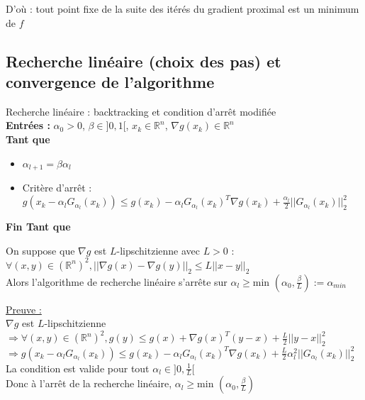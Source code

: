 \documentclass[12pt,a4paper]{article}
\newcommand{\propriete}[2]{%
    \begin{tcolorbox}[colback=white,colframe=green!25!white,title=\textbf{Propriété #1}, coltitle=black]
        #2
    \end{tcolorbox}
}
\begin{document}
\begin{enumerate}[label=\roman*)]
    D'où : tout point fixe de la suite des itérés du gradient proximal est un minimum de $f$\\    
\end{enumerate}


\subsection{Recherche linéaire (choix des pas) et convergence de l'algorithme}


\begin{algorithm}
    Recherche linéaire : backtracking et condition d'arrêt modifiée\\
    \SetAlgoLined
    \textbf{Entrées :} $\alpha_0 > 0$, $\beta \in ]0, 1[$, $x_k \in \mathbb{R}^n$, $\nabla g(x_k) \in \mathbb{R}^n$\\
    \textbf{Tant que}\\
    \begin{itemize}
        \item $\alpha_{l+1} = \beta \alpha_l$
        \item Critère d'arrêt : $g(x_k - \alpha_l G_{\alpha_l}(x_k)) \leq g(x_k) - \alpha_l G_{\alpha_l}(x_k)^T \nabla g(x_k) + \frac{\alpha_l}{2} ||G_{\alpha_l}(x_k)||_2^2$\\
    \end{itemize}
    \textbf{Fin Tant que}\\
\end{algorithm}


\propriete{}{
    On suppose que $\nabla g$ est $L$-lipschitzienne avec $L > 0$ :\\
    $\forall (x, y) \in (\mathbb{R}^n)^2, ||\nabla g(x) - \nabla g(y)||_2 \leq L ||x - y||_2$\\
    Alors l'algorithme de recherche linéaire s'arrête sur $\alpha_l \geq \text{min } (\alpha_0, \frac{\beta}{L}) := \alpha_{min}$
}

\noindent\underline{Preuve :}\\
$\nabla g$ est $L$-lipschitzienne $\Rightarrow \forall (x, y) \in (\mathbb{R}^n)^2, g(y) \leq g(x) + \nabla g(x)^T (y - x) + \frac{L}{2} ||y - x||_2^2$\\
$\Rightarrow g(x_k - \alpha_l G_{\alpha_l}(x_k)) \leq g(x_k) - \alpha_l G_{\alpha_l}(x_k)^T \nabla g(x_k) + \frac{L}{2} \alpha_l^2 ||G_{\alpha_l}(x_k)||_2^2$\\

\noindent La condition est valide pour tout $\alpha_l \in ]0, \frac{1}{L}[$\\
Donc à l'arrêt de la recherche linéaire, $\alpha_l \geq \text{min } (\alpha_0, \frac{\beta}{L})$\\
\end{document}
